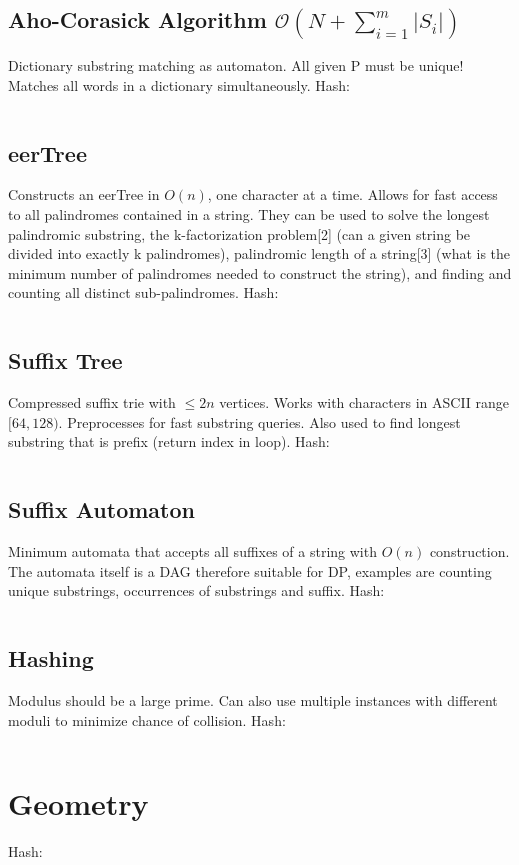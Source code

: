 \documentclass[9pt,a4paper,landscape,oneside]{amsart}
\newcommand{\mintedstyle}[2]{\inputminted{#1}{code/#2}}
\newcommand{\code}[1]{ Hash: 
\mintedstyle{cpp}{#1}}
\begin{document}
\begin{multicols*}{3}
\subsection{Aho-Corasick Algorithm $\mathcal{O}(N + \sum_{i=1}^{m} |S_i|)$}
Dictionary substring matching as automaton. All given P must be unique! Matches all words in a dictionary simultaneously.
\code{strings/aho_corasick.cpp}

\subsection{eerTree}
Constructs an eerTree in $O(n)$, one character at a time. Allows for fast access to all palindromes contained in a string. They can be used to solve the longest palindromic substring, the k-factorization problem[2] (can a given string be divided into exactly k palindromes), palindromic length of a string[3] (what is the minimum number of palindromes needed to construct the string), and finding and counting all distinct sub-palindromes.
\code{strings/eertree.cpp}

\subsection{Suffix Tree}
Compressed suffix trie with $\leq 2n$ vertices.
Works with characters in ASCII range $[64, 128)$. Preprocesses for fast substring queries. Also used to find longest substring that is prefix (return index in loop).
\code{strings/suffix_tree.cpp}

\subsection{Suffix Automaton}
Minimum automata that accepts all suffixes of a string with $O(n)$
construction. The automata itself is a DAG therefore suitable for DP,
examples are counting unique substrings, occurrences of substrings and
suffix.
\code{strings/suffix_automaton.cpp}

\subsection{Hashing}
Modulus should be a large prime. Can also use multiple instances with
different moduli to minimize chance of collision.
\code{strings/hasher.cpp}

\section{Geometry}
\code{geometry/main.cpp}


\end{multicols*}
\end{document}
